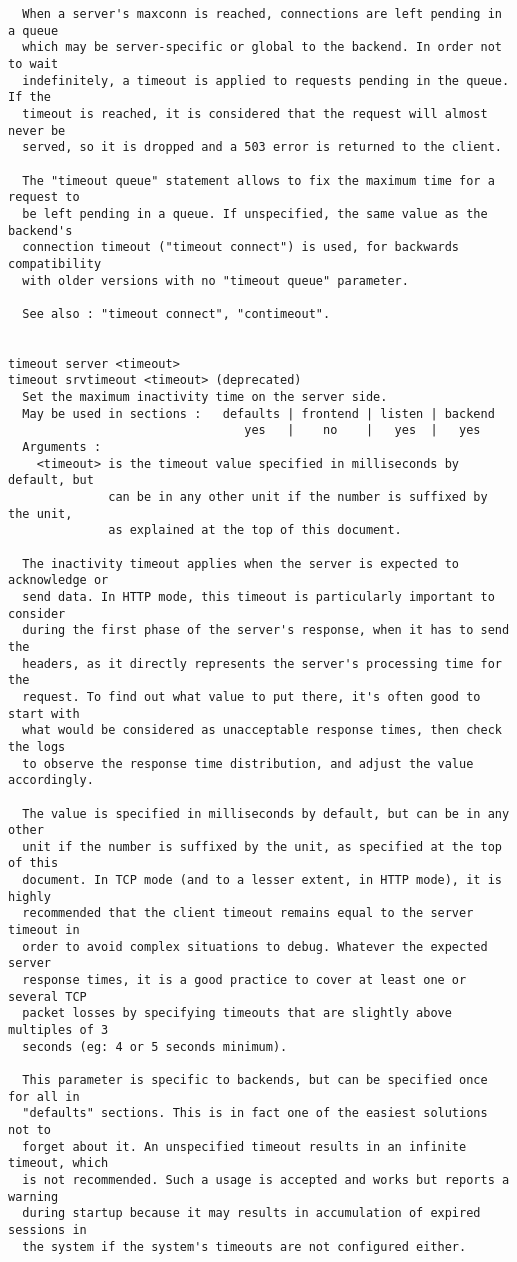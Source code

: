 \begin{verbatim}
  When a server's maxconn is reached, connections are left pending in a queue
  which may be server-specific or global to the backend. In order not to wait
  indefinitely, a timeout is applied to requests pending in the queue. If the
  timeout is reached, it is considered that the request will almost never be
  served, so it is dropped and a 503 error is returned to the client.

  The "timeout queue" statement allows to fix the maximum time for a request to
  be left pending in a queue. If unspecified, the same value as the backend's
  connection timeout ("timeout connect") is used, for backwards compatibility
  with older versions with no "timeout queue" parameter.

  See also : "timeout connect", "contimeout".


timeout server <timeout>
timeout srvtimeout <timeout> (deprecated)
  Set the maximum inactivity time on the server side.
  May be used in sections :   defaults | frontend | listen | backend
                                 yes   |    no    |   yes  |   yes
  Arguments :
    <timeout> is the timeout value specified in milliseconds by default, but
              can be in any other unit if the number is suffixed by the unit,
              as explained at the top of this document.

  The inactivity timeout applies when the server is expected to acknowledge or
  send data. In HTTP mode, this timeout is particularly important to consider
  during the first phase of the server's response, when it has to send the
  headers, as it directly represents the server's processing time for the
  request. To find out what value to put there, it's often good to start with
  what would be considered as unacceptable response times, then check the logs
  to observe the response time distribution, and adjust the value accordingly.

  The value is specified in milliseconds by default, but can be in any other
  unit if the number is suffixed by the unit, as specified at the top of this
  document. In TCP mode (and to a lesser extent, in HTTP mode), it is highly
  recommended that the client timeout remains equal to the server timeout in
  order to avoid complex situations to debug. Whatever the expected server
  response times, it is a good practice to cover at least one or several TCP
  packet losses by specifying timeouts that are slightly above multiples of 3
  seconds (eg: 4 or 5 seconds minimum).

  This parameter is specific to backends, but can be specified once for all in
  "defaults" sections. This is in fact one of the easiest solutions not to
  forget about it. An unspecified timeout results in an infinite timeout, which
  is not recommended. Such a usage is accepted and works but reports a warning
  during startup because it may results in accumulation of expired sessions in
  the system if the system's timeouts are not configured either.


\end{verbatim}

